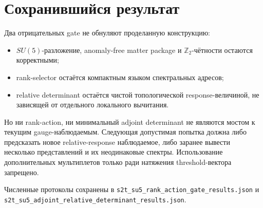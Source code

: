 \documentclass[12pt,a4paper]{article}
\begin{document}
\section{Сохранившийся результат}

Два отрицательных gate не обнуляют проделанную конструкцию:
\begin{itemize}
 \item $SU(5)$-разложение, anomaly-free matter package и $\mathbb Z_2$-чётности
 остаются корректными;
 \item rank-selector остаётся компактным языком спектральных адресов;
 \item relative determinant остаётся чистой топологической response-величиной,
 не зависящей от отдельного локального вычитания.
\end{itemize}

Но ни rank-action, ни минимальный adjoint determinant не являются мостом к
текущим gauge-наблюдаемым. Следующая допустимая попытка должна либо предсказать
новое relative-response наблюдаемое, либо заранее вывести несколько
представлений и их неодинаковые спектры. Использование дополнительных
мультиплетов только ради натяжения threshold-вектора запрещено.

Численные протоколы сохранены в
\texttt{s2t\_su5\_rank\_action\_gate\_results.json} и
\texttt{s2t\_su5\_adjoint\_relative\_determinant\_results.json}.
\end{document}
